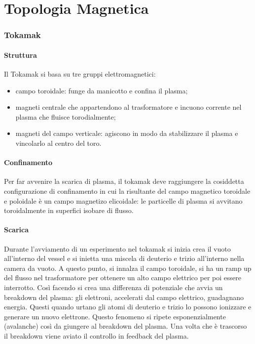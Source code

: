 \documentclass{article}
\begin{document}
\tableofcontents
\part{Topologia Magnetica}
\section{Tokamak}
\subsection{Struttura}
Il Tokamak si basa su tre gruppi elettromagnetici:\begin{itemize}
    \item campo toroidale: funge da manicotto e confina il plasma;
    \item magneti centrale che appartendono al trasformatore e incuono corrente nel plasma che fluisce torodialmente;
    \item magneti del campo verticale: agiscono in modo da stabilizzare il plasma e vincolarlo al centro del toro.
\end{itemize}
\subsection{Confinamento}
Per far avvenire la scarica di plasma, il tokamak deve raggiungere la cosiddetta configurazione di confinamento in cui la risultante del campo magnetico toroidale e poloidale è un campo magnetizo elicoidale: le particelle di plasma si avvitano toroidalmente in superfici isobare di flusso.
\subsection{Scarica}
Durante l'avviamento di un esperimento nel tokamak si inizia crea il vuoto all'interno del vessel e si inietta una miscela di deuterio e trizio all'interno nella camera da vuoto. A questo punto, si innalza il campo toroidale, si ha un ramp up del flusso nel trasformatore per ottenere un alto campo elettrico per poi essere interrotto. Così facendo si crea una differenza di potenziale che avvia un breakdown del plasma: gli elettroni, accelerati dal campo elettrico, guadagnano energia. Questi quando urtano gli atomi di deuterio e trizio lo possono ionizzare e generare un nuovo elettrone. Questo fenomeno si ripete esponenzialmente (avalanche) così da giungere al breakdown del plasma.\newline
Una volta che è trascorso il breakdown viene aviato il controllo in feedback del plasma.
\end{document}
